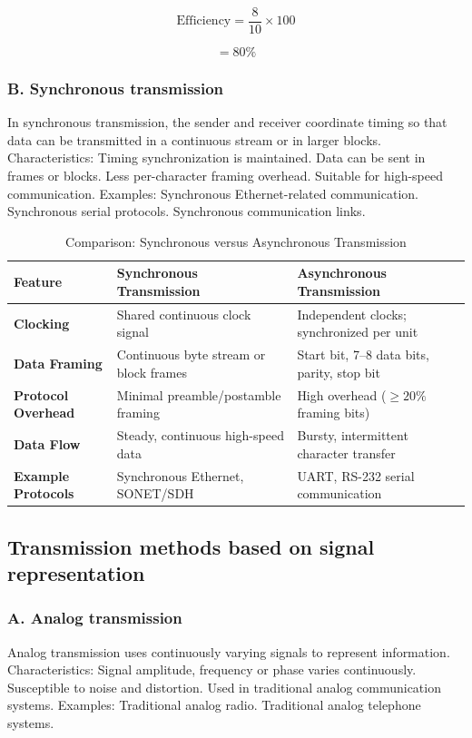 \[
\text{Efficiency}=\frac{8}{10}\times100
\]


\[
=\boxed{80\%}
\]

\subsubsection{B. Synchronous transmission}
In synchronous transmission, the sender and receiver coordinate timing so that data can be transmitted in a continuous stream or in larger blocks.
Characteristics:
Timing synchronization is maintained.
Data can be sent in frames or blocks.
Less per-character framing overhead.
Suitable for high-speed communication.
Examples:
Synchronous Ethernet-related communication.
Synchronous serial protocols.
Synchronous communication links.
\begin{table}[htbp]
\centering
\caption{Comparison: Synchronous versus Asynchronous Transmission}
\label{tab:sync_vs_async}
\begin{tabularx}{\textwidth}{p{3.8cm} X X}
\toprule
\textbf{Feature} & \textbf{Synchronous Transmission} & \textbf{Asynchronous Transmission} \\
\midrule
\textbf{Clocking} & Shared continuous clock signal & Independent clocks; synchronized per unit \\
\textbf{Data Framing} & Continuous byte stream or block frames & Start bit, 7--8 data bits, parity, stop bit \\
\textbf{Protocol Overhead} & Minimal preamble/postamble framing & High overhead ($\ge 20\%$ framing bits) \\
\textbf{Data Flow} & Steady, continuous high-speed data & Bursty, intermittent character transfer \\
\textbf{Example Protocols} & Synchronous Ethernet, SONET/SDH & UART, RS-232 serial communication \\
\bottomrule
\end{tabularx}
\end{table}
\subsection{Transmission methods based on signal representation}
\subsubsection{A. Analog transmission}
Analog transmission uses continuously varying signals to represent information.
Characteristics:
Signal amplitude, frequency or phase varies continuously.
Susceptible to noise and distortion.
Used in traditional analog communication systems.
Examples:
Traditional analog radio.
Traditional analog telephone systems.

